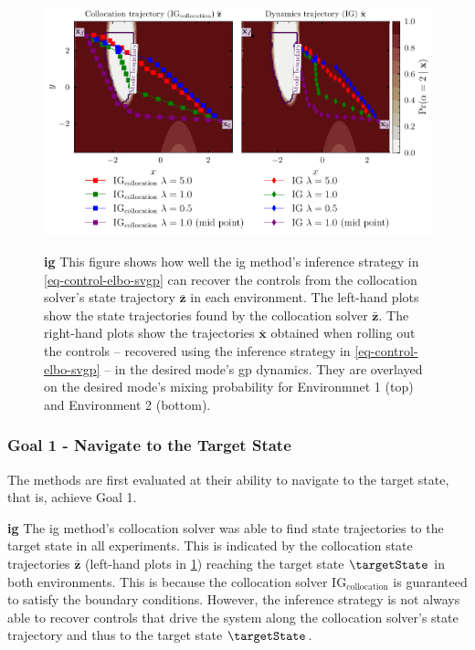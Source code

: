 \documentclass{mimosis-class/mimosis}
\numberwithin{equation}{chapter}
\begin{document}
{\begin{figure}
\begin{minipage}[r]{\columnwidth}
\label{fig-collocation-traj-opt-7}
\end{minipage}
\begin{minipage}[r]{\columnwidth}
\centering
\includegraphics[width=\textwidth]{./images/mode-opt/trajectory_optimisation/collocation_trajectories_over_desired_prob_scenario_5.pdf}
\label{fig-collocation-traj-opt-5}
\end{minipage}
\caption[\acrfull{ig} trajectory optimisation results in simulated environments]{\textbf{\acrfull{ig}}
This figure shows how well the \acrshort{ig} method's inference strategy
in \cref{eq-control-elbo-svgp} can
recover the controls from the collocation solver's state trajectory $\bar{\mathbf{z}}$ in each environment.
The left-hand plots show the state trajectories found by the collocation solver $\bar{\mathbf{z}}$.
The right-hand plots show the trajectories $\bar{\mathbf{x}}$ obtained when
rolling out the controls -- recovered using the inference strategy in \cref{eq-control-elbo-svgp} --
in the desired mode's \acrshort{gp} dynamics.
They are overlayed on the desired mode's mixing probability for Environmnet 1 (top) and Environment 2 (bottom).}
\label{fig-collocation-traj-opt}
\end{figure}

\subsubsection{Goal 1 - Navigate to the Target State}
\label{sec:org694ba52}
The methods are first evaluated at their ability to navigate to the target state, that is, achieve Goal 1.

\textbf{\acrfull{ig}}
The \acrshort{ig} method's collocation solver was able to
find state trajectories to the target state in all experiments.
This is indicated by the collocation state trajectories \(\bar{\mathbf{z}}\) (left-hand plots in
\cref{fig-collocation-traj-opt}) reaching the target state  \(\targetState\) in both environments.
This is because the collocation solver \(\text{IG}_{\text{collocation}}\) is guaranteed to
satisfy the boundary conditions.
However, the inference strategy is not always able to recover controls that
drive the system along the collocation solver's state trajectory and thus to the target state \(\targetState\).

}
\end{document}
